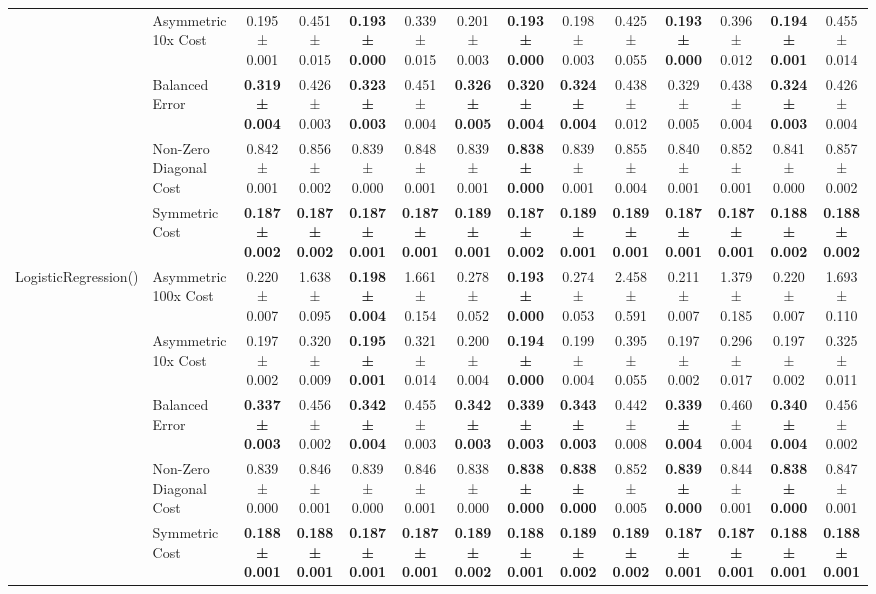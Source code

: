 \begin{table}[H]
{\begin{tabular}{llcccccccccccc}
 & Asymmetric 10x Cost & 0.195 ± 0.001 & 0.451 ± 0.015 & \textbf{0.193 ± 0.000} & 0.339 ± 0.015 & 0.201 ± 0.003 & \textbf{0.193 ± 0.000} & 0.198 ± 0.003 & 0.425 ± 0.055 & \textbf{0.193 ± 0.000} & 0.396 ± 0.012 & \textbf{0.194 ± 0.001} & 0.455 ± 0.014 \\
 & Balanced Error & \textbf{0.319 ± 0.004} & 0.426 ± 0.003 & \textbf{0.323 ± 0.003} & 0.451 ± 0.004 & \textbf{0.326 ± 0.005} & \textbf{0.320 ± 0.004} & \textbf{0.324 ± 0.004} & 0.438 ± 0.012 & 0.329 ± 0.005 & 0.438 ± 0.004 & \textbf{0.324 ± 0.003} & 0.426 ± 0.004 \\
 & Non-Zero Diagonal Cost & 0.842 ± 0.001 & 0.856 ± 0.002 & 0.839 ± 0.000 & 0.848 ± 0.001 & 0.839 ± 0.001 & \textbf{0.838 ± 0.000} & 0.839 ± 0.001 & 0.855 ± 0.004 & 0.840 ± 0.001 & 0.852 ± 0.001 & 0.841 ± 0.000 & 0.857 ± 0.002 \\
 & Symmetric Cost & \textbf{0.187 ± 0.002} & \textbf{0.187 ± 0.002} & \textbf{0.187 ± 0.001} & \textbf{0.187 ± 0.001} & \textbf{0.189 ± 0.001} & \textbf{0.187 ± 0.002} & \textbf{0.189 ± 0.001} & \textbf{0.189 ± 0.001} & \textbf{0.187 ± 0.001} & \textbf{0.187 ± 0.001} & \textbf{0.188 ± 0.002} & \textbf{0.188 ± 0.002} \\
\cline{1-14}
\multirow[t]{5}{*}{LogisticRegression()} & Asymmetric 100x Cost & 0.220 ± 0.007 & 1.638 ± 0.095 & \textbf{0.198 ± 0.004} & 1.661 ± 0.154 & 0.278 ± 0.052 & \textbf{0.193 ± 0.000} & 0.274 ± 0.053 & 2.458 ± 0.591 & 0.211 ± 0.007 & 1.379 ± 0.185 & 0.220 ± 0.007 & 1.693 ± 0.110 \\
 & Asymmetric 10x Cost & 0.197 ± 0.002 & 0.320 ± 0.009 & \textbf{0.195 ± 0.001} & 0.321 ± 0.014 & 0.200 ± 0.004 & \textbf{0.194 ± 0.000} & 0.199 ± 0.004 & 0.395 ± 0.055 & 0.197 ± 0.002 & 0.296 ± 0.017 & 0.197 ± 0.002 & 0.325 ± 0.011 \\
 & Balanced Error & \textbf{0.337 ± 0.003} & 0.456 ± 0.002 & \textbf{0.342 ± 0.004} & 0.455 ± 0.003 & \textbf{0.342 ± 0.003} & \textbf{0.339 ± 0.003} & \textbf{0.343 ± 0.003} & 0.442 ± 0.008 & \textbf{0.339 ± 0.004} & 0.460 ± 0.004 & \textbf{0.340 ± 0.004} & 0.456 ± 0.002 \\
 & Non-Zero Diagonal Cost & 0.839 ± 0.000 & 0.846 ± 0.001 & 0.839 ± 0.000 & 0.846 ± 0.001 & 0.838 ± 0.000 & \textbf{0.838 ± 0.000} & \textbf{0.838 ± 0.000} & 0.852 ± 0.005 & \textbf{0.839 ± 0.000} & 0.844 ± 0.001 & \textbf{0.838 ± 0.000} & 0.847 ± 0.001 \\
 & Symmetric Cost & \textbf{0.188 ± 0.001} & \textbf{0.188 ± 0.001} & \textbf{0.187 ± 0.001} & \textbf{0.187 ± 0.001} & \textbf{0.189 ± 0.002} & \textbf{0.188 ± 0.001} & \textbf{0.189 ± 0.002} & \textbf{0.189 ± 0.002} & \textbf{0.187 ± 0.001} & \textbf{0.187 ± 0.001} & \textbf{0.188 ± 0.001} & \textbf{0.188 ± 0.001} \\

\end{tabular}}
\end{table}
